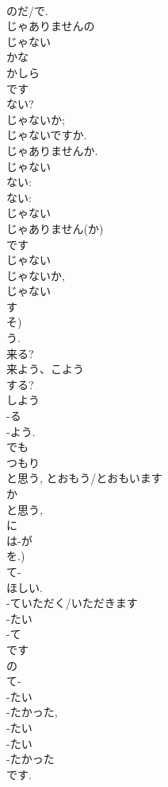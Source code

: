 \documentclass[8pt]{extreport}
\begin{document}
\begin{CJK}{UTF8}{min}
\\	のだ/で.
\\	じゃありませんの 
\\	じゃない 
\\	かな 
\\	かしら 
\\	です 
\\	ない?	
\\	じゃないか; 
\\	じゃないですか. 
\\	じゃありませんか.	
\\	じゃない 
\\	ない: 
\\	ない: 
\\	じゃない 
\\	じゃありません(か) 
\\	です
\\	じゃない 
\\	じゃないか, 
\\	じゃない 
\\	す 
\\	そ) 
\\	う.	
\\	来る?
\\	来よう、こよう	
\\	する?
\\	しよう	
\\	-る 
\\	-よう.	
\\	でも 
\\	つもり 
\\	と思う, とおもう/とおもいます 
\\	か 
\\	と思う, 
\\	に 
\\	は-が 
\\	を.)	
\\	て-
\\	ほしい. 
\\	-ていただく/いただきます
\\	-たい		
\\	-て 
\\	です 
\\	の 
\\	て-
\\	-たい 
\\	-たかった, 
\\	-たい 
\\	-たい 
\\	-たかった 
\\	です. 

\end{CJK}
\end{document}
